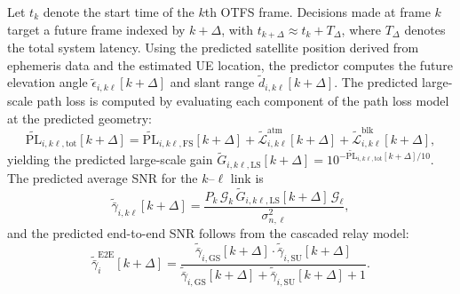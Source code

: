\documentclass[journal]{IEEEtran}
\begin{document}
Let $t_k$ denote the start time of the $k$th OTFS frame. Decisions made at frame $k$ target a future frame indexed by $k + \Delta$, with $t_{k+\Delta} \approx t_k + T_{\Delta}$, where $T_{\Delta}$ denotes the total system latency. Using the predicted satellite position derived from ephemeris data and  the estimated UE location, the predictor computes the future elevation  angle $\tilde{\epsilon}_{i,k\ell}[k+\Delta]$ and slant range $\tilde{d}_{i,k\ell}[k+\Delta]$. The predicted large-scale path loss is computed by evaluating each component of the path loss model at the predicted geometry:
\begin{equation}
\widetilde{\mathrm{PL}}_{i,k\ell,\mathrm{tot}}[k+\Delta] = \widetilde{\mathrm{PL}}_{i,k\ell,\mathrm{FS}}[k+\Delta] + \tilde{\mathcal{L}}_{i,k\ell}^{\mathrm{atm}}[k+\Delta] + \tilde{\mathcal{L}}_{i,k\ell}^{\mathrm{blk}}[k+\Delta],
\label{eq:predicted_path_loss}
\end{equation}
yielding the predicted large-scale gain $\tilde{G}_{i,k\ell,\mathrm{LS}}[k+\Delta] = 10^{-\widetilde{\mathrm{PL}}_{i,k\ell,\mathrm{tot}}[k+\Delta]/10}$. The predicted average SNR for the $k$--$\ell$ link is
\begin{equation}
\tilde{\bar{\gamma}}_{i,k\ell}[k+\Delta] = \frac{P_k\, \mathcal{G}_k\, \tilde{G}_{i,k\ell,\mathrm{LS}}[k+\Delta]\, \mathcal{G}_\ell}{\sigma_{n,\ell}^2},
\label{eq:predicted_avg_snr}
\end{equation}
and the predicted end-to-end SNR follows from the cascaded relay model:
\begin{equation}
\tilde{\bar{\gamma}}_{i}^{\mathrm{E2E}}[k+\Delta] = \frac{\tilde{\bar{\gamma}}_{i,\mathrm{GS}}[k+\Delta] \cdot \tilde{\bar{\gamma}}_{i,\mathrm{SU}}[k+\Delta]}{\tilde{\bar{\gamma}}_{i,\mathrm{GS}}[k+\Delta] + \tilde{\bar{\gamma}}_{i,\mathrm{SU}}[k+\Delta] + 1}.
\label{eq:predicted_cascaded_snr}
\end{equation}
\end{document}
